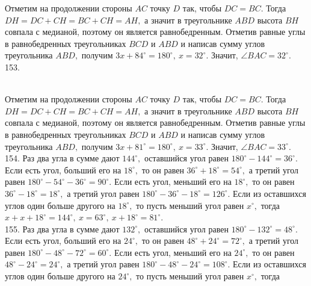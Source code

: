 \documentclass[12pt]{article}
\begin{document}
Отметим на продолжении стороны $AC$ точку $D$ так, чтобы $DC=BC.$ Тогда $DH=DC+CH=BC+CH=AH,$ а значит в треугольнике $ABD$ высота $BH$ совпала с медианой, поэтому он является равнобедренным. Отметив равные углы в равнобедренных треугольниках $BCD$ и $ABD$ и написав сумму углов треугольника $ABD,$ получим $3x+84^\circ=180^\circ,\ x=32^\circ.$ Значит, $\angle BAC=32^\circ.$\\
153. \begin{figure}[ht!]
\end{figure}\\
Отметим на продолжении стороны $AC$ точку $D$ так, чтобы $DC=BC.$ Тогда $DH=DC+CH=BC+CH=AH,$ а значит в треугольнике $ABD$ высота $BH$ совпала с медианой, поэтому он является равнобедренным. Отметив равные углы в равнобедренных треугольниках $BCD$ и $ABD$ и написав сумму углов треугольника $ABD,$ получим $3x+81^\circ=180^\circ,\ x=33^\circ.$ Значит, $\angle BAC=33^\circ.$\\
154. Раз два угла в сумме дают $144^\circ,$ оставшийся угол равен $180^\circ-144^\circ=36^\circ.$ Если есть угол, больший его на $18^\circ,$ то он равен $36^\circ+18^\circ=54^\circ,$ а третий угол равен $180^\circ-54^\circ-36^\circ=90^\circ.$ Если есть угол, меньший его на $18^\circ,$ то он равен $36^\circ-18^\circ=18^\circ,$ а третий угол равен
$180^\circ-36^\circ-18^\circ=126^\circ.$ Если из оставшихся углов один больше другого на $18^\circ,$ то пусть меньший угол равен $x^\circ,$ тогда
$x+x+18^\circ=144^\circ,\ x=63^\circ,\ x+18^\circ=81^\circ.$\\
155. Раз два угла в сумме дают $132^\circ,$ оставшийся угол равен $180^\circ-132^\circ=48^\circ.$ Если есть угол, больший его на $24^\circ,$ то он равен $48^\circ+24^\circ=72^\circ,$ а третий угол равен $180^\circ-48^\circ-72^\circ=60^\circ.$ Если есть угол, меньший его на $24^\circ,$ то он равен $48^\circ-24^\circ=24^\circ,$ а третий угол равен
$180^\circ-48^\circ-24^\circ=108^\circ.$ Если из оставшихся углов один больше другого на $24^\circ,$ то пусть меньший угол равен $x^\circ,$ тогда
\end{document}
